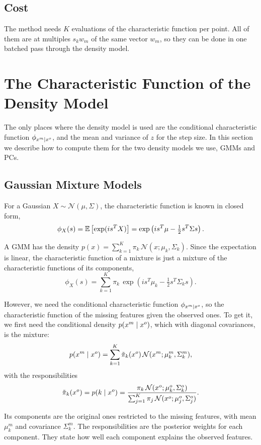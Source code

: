 \subsection{Cost}

The method needs $K$ evaluations of the characteristic function per point. All of them are at multiples $s_k w_m$ of the same
vector $w_m$, so they can be done in one batched pass through the density model.

\section{The Characteristic Function of the Density Model}
\label{sec:density-cf}

The only places where the density model is used are the conditional
characteristic function $\phi_{x^m \mid x^o}$, and the mean and variance of $z$ for the step size. In this section we describe how to compute them for the two
density models we use, GMMs and PCs.

\subsection{Gaussian Mixture Models}
\label{subsec:gmm-cf}

For a Gaussian $X \sim \mathcal{N}(\mu, \Sigma)$, the characteristic function
is known in closed form,
\[
  \phi_X(s) = \mathbb{E}\left[\exp(i s^T X)\right] = \exp \left( i s^T \mu - \tfrac{1}{2} s^T \Sigma s \right).
\]

A GMM has the density $p(x) = \sum_{k=1}^{K} \pi_k\, \mathcal{N}(x; \mu_k, \Sigma_k)$.
Since the expectation is linear, the characteristic function of a
mixture is just a mixture of the characteristic functions of its components,
\[
  \phi_X(s) = \sum_{k=1}^{K} \pi_k\, \exp \left( i s^T \mu_k - \tfrac{1}{2} s^T \Sigma_k s \right).
\]

However, we need the conditional characteristic function $\phi_{x^m \mid x^o}$, so the
characteristic function of the missing features given the observed ones. To get it, we
first need the conditional density $p(x^m \mid x^o)$, which with diagonal covariances, is the mixture:
\[
  p(x^m \mid x^o) = \sum_{k=1}^{K} \tilde{\pi}_k(x^o)\, \mathcal{N}(x^m; \mu_k^m, \Sigma_k^m),
\]
with the responsibilities
\[
  \tilde{\pi}_k(x^o) = p(k \mid x^o) = \frac{\pi_k\, \mathcal{N}(x^o; \mu_k^o, \Sigma_k^o)}{\sum_{j=1}^{K} \pi_j\, \mathcal{N}(x^o; \mu_j^o, \Sigma_j^o)}.
\]

Its components are the original ones restricted to the missing features, with
mean $\mu_k^m$ and covariance $\Sigma_k^m$. The responsibilities are the posterior
weights for each component. They state how well each component explains the
observed features.

